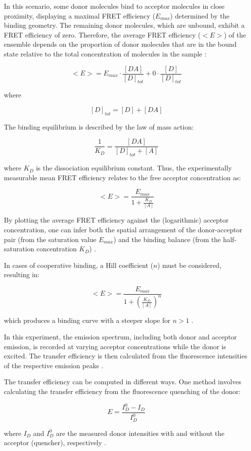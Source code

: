 \documentclass[a4paper,english,12pt,bibliography=totoc]{scrreprt}
\begin{document}
In this scenario, some donor molecules bind to acceptor molecules in close proximity, displaying a maximal FRET efficiency (\(E_{max}\)) determined by the binding geometry. The remaining donor molecules, which are unbound, exhibit a FRET efficiency of zero. Therefore, the average FRET efficiency (\(<E>\)) of the ensemble depends on the proportion of donor molecules that are in the bound state relative to the total concentration of molecules in the sample :

\[
<E> = E_{max} \cdot \frac{[DA]}{[D]_{tot}} + 0 \cdot \frac{[D]}{[D]_{tot}}
\]

where

\[
[D]_{tot} = [D] + [DA]
\]

The binding equilibrium is described by the law of mass action:

\[
\frac{1}{K_D} = \frac{[DA]}{[D]_{tot} + [A]}
\]

where \(K_D\) is the dissociation equilibrium constant. Thus, the experimentally measurable mean FRET efficiency relates to the free acceptor concentration as:

\[
<E> = \frac{E_{max}}{1 + \frac{K_D}{[A]}}
\]

By plotting the average FRET efficiency against the (logarithmic) acceptor concentration, one can infer both the spatial arrangement of the donor-acceptor pair (from the saturation value \(E_{max}\)) and the binding balance (from the half-saturation concentration \(K_D\)) .

In cases of cooperative binding, a Hill coefficient (\(n\)) must be considered, resulting in:

\[
<E> = \frac{E_{max}}{1 + \left(\frac{K_D}{[A]}\right)^n}
\]

which produces a binding curve with a steeper slope for \(n > 1\) .

In this experiment, the emission spectrum, including both donor and acceptor emission, is recorded at varying acceptor concentrations while the donor is excited. The transfer efficiency is then calculated from the fluorescence intensities of the respective emission peaks .

The transfer efficiency can be computed in different ways. One method involves calculating the transfer efficiency from the fluorescence quenching of the donor:

\[
E = \frac{I_D^0 - I_D}{I_D^0}
\]

where \(I_D\) and \(I_D^0\) are the measured donor intensities with and without the acceptor (quencher), respectively \cite{lab_script}.
\end{document}
